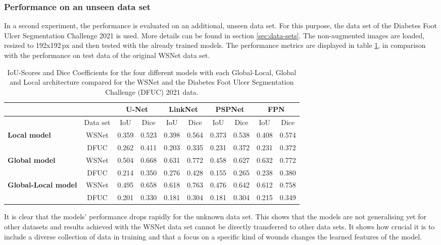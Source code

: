 \subsubsection{Performance on an unseen data set}

In a second experiment, the performance is evaluated on an additional, unseen data set. For this purpose, the data set of the Diabetes Foot Ulcer Segmentation Challenge 2021 \cite{Wang2020} is used. More details can be found in section \ref{sec:data-sets}. The non-augmented images are loaded, resized to 192x192\,px and then tested with the already trained models. The performance metrics are displayed in table \ref{table:dataset-comparison}, in comparison with the performance on test data of the original WSNet data set.


\begin{table}[htb!]
	\centering
	\begin{tabular}{l | c ||c | c || c | c || c | c || c | c||}
	& & \multicolumn{2}{|c||}{U-Net} & \multicolumn{2}{|c||}{LinkNet} & \multicolumn{2}{|c||}{PSPNet} & \multicolumn{2}{|c||}{FPN} \\
	\hline
	& Data set & IoU & Dice & IoU & Dice & IoU & Dice & IoU & Dice \\
	\hline\hline
	\multirow{2}{*}{\textbf{Local model}} & WSNet & 0.359 & 0.523 & 0.398 & 0.564 & 0.373 & 0.538 & 0.408 & 0.574 \\
	& DFUC & 0.262 & 0.411 & 0.203 & 0.335 & 0.231 & 0.372 & 0.231 & 0.372\\
	\hline
	\multirow{2}{*}{\textbf{Global model}} & WSNet & 0.504 & 0.668 & 0.631 & 0.772 & 0.458 & 0.627 & 0.632 & 0.772 \\
	& DFUC & 0.214 & 0.350 & 0.276 & 0.428 & 0.155 & 0.265 & 0.238 & 0.380\\
	\hline
	\multirow{2}{*}{\textbf{Global-Local model}} & WSNet & 0.495 & 0.658 & 0.618 & 0.763 & 0.476 & 0.642 & 0.612 & 0.758\\
	& DFUC & 0.201 & 0.330 & 0.181 & 0.304 & 0.181 & 0.304 & 0.215 & 0.349\\
	\end{tabular}
	\caption{IoU-Scores and Dice Coefficients for the four different models with each Global-Local, Global and Local architecture compared for the WSNet and the Diabetes Foot Ulcer Segmentation Challenge (DFUC) 2021 data.}
	\label{table:dataset-comparison}
\end{table}

It is clear that the models' performance drops rapidly for the unknown data set. This shows that the models are not generalising yet for other datasets and results achieved with the WSNet data set cannot be directly transferred to other data sets. It shows how crucial it is to include a diverse collection of data in training and that a focus on a specific kind of wounds changes the learned features of the model.


